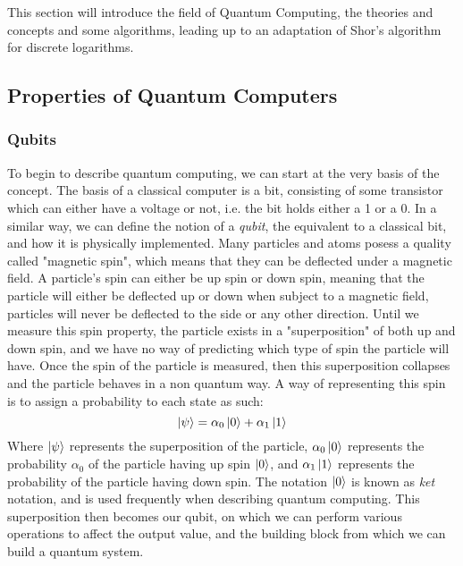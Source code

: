 This section will introduce the field of Quantum Computing, the theories and concepts and some algorithms, leading up to an adaptation of Shor's algorithm for discrete logarithms.
\subsection{Properties of Quantum Computers}
\subsubsection{Qubits}
To begin to describe quantum computing, we can start at the very basis of the concept. The basis of a classical computer is a bit, consisting of some transistor which can either have a voltage or not, i.e. the bit holds either a 1 or a 0. In a similar way, we can define the notion of a \emph{qubit}, the equivalent to a classical bit, and how it is physically implemented. Many particles and atoms posess a quality called "magnetic spin", which means that they can be deflected under a magnetic field. A particle's spin can either be up spin or down spin, meaning that the particle will either be deflected up or down when subject to a magnetic field, particles will never be deflected to the side or any other direction. Until we measure this spin property, the particle exists in a "superposition" of both up and down spin, and we have no way of predicting which type of spin the particle will have. Once the spin of the particle is measured, then this superposition collapses and the particle behaves in a non quantum way. A way of representing this spin is to assign a probability to each state as such: $$\ket{\psi} = \alpha_0\ket{0} + \alpha_1\ket{1}$$ Where $\ket{\psi}$ represents the superposition of the particle, $\alpha_0\ket{0}$ represents the probability $\alpha_0$ of the particle having up spin $\ket{0}$, and $\alpha_1\ket{1}$ represents the probability of the particle having down spin. The notation $\ket{0}$ is known as \emph{ket} notation, and is used frequently when describing quantum computing. This superposition then becomes our qubit, on which we can perform various operations to affect the output value, and the building block from which we can build a quantum system.
